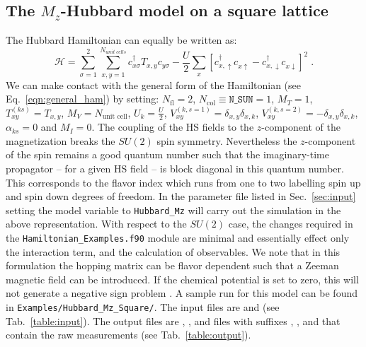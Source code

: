 \documentclass{SciPost}
\begin{document}
\subsection{The $M_z$-Hubbard model on a square lattice}\label{sec:walk1.1}
%
The Hubbard Hamiltonian can equally be written as:
\begin{equation}
\label{eqn_hubbard_Mz}
\mathcal{H}=
\sum\limits_{\sigma=1}^{2} 
\sum\limits_{x,y =1 }^{N_{unit\; cells }} 
  c^{\dagger}_{x \sigma} T_{x,y}c^{\phantom\dagger}_{y \sigma} 
- \frac{U}{2}\sum\limits_{x}\left[
c^{\dagger}_{x, \uparrow} c^{\phantom\dagger}_{x \uparrow}  -   c^{\dagger}_{x, \downarrow} c^{\phantom\dagger}_{x \downarrow}  \right]^{2}\;.
\end{equation} 
We can make contact with the general form of the Hamiltonian  (see Eq.~\ref{eqn:general_ham}) by setting: 
$N_{\mathrm{fl}} = 2$, $N_{\mathrm{col}} \equiv \texttt{N\_SUN}     =1 $,   $M_T    =    1$,  $T^{(ks)}_{x y}   =  T_{x,y}$,  $M_V   =  N_{\text{unit cell}} $,  $U_{k}       =   \frac{U}{2}$, 
 $V_{x y}^{(k, s=1)} =  \delta_{x,y} \delta_{x,k}  $,  $V_{x y}^{(k, s=2)} =  - \delta_{x,y} \delta_{x,k}  $,  $\alpha_{ks}   = 0  $ and $M_I       = 0 $.   
 The coupling of the HS fields to the $z$-component of   the magnetization breaks the $SU(2)$ spin symmetry. Nevertheless the $z$-component of the spin remains a good quantum number such that the imaginary-time propagator -- for a given HS field -- is block  diagonal in this quantum number. This corresponds to the flavor index  which runs from one to two  labelling spin up and spin down  degrees of freedom.       In the parameter file  listed in  Sec.~\ref{sec:input}  setting the model variable to  \texttt{Hubbard\_Mz}  will carry out the simulation in the above representation. 
 With respect to the $SU(2)$ case, the changes required in the \texttt{Hamiltonian\_Examples.f90}   module are  minimal and essentially effect only the interaction term, and the calculation of observables.  We note that  in this formulation the  hopping matrix can be flavor dependent such that a Zeeman  magnetic field can be introduced.  If the chemical potential is set to zero, this will not generate a negative sign problem \cite{Wu04,Milat04,Bercx09}.    
 A sample run for this model can be found in \texttt{Examples/Hubbard\_Mz\_Square/}.
The input files are  and  (see Tab.~\ref{table:input}). The output files are , , and files with suffixes , , and  that 
contain the raw measurements (see Tab.~\ref{table:output}).
%
\end{document}

